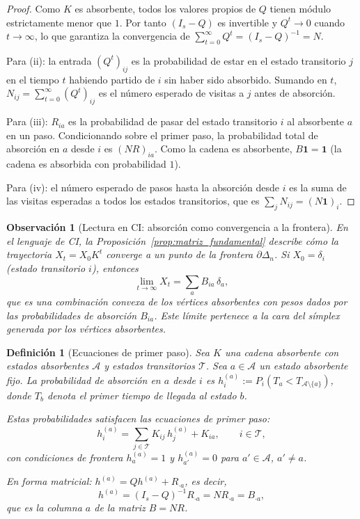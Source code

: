﻿\documentclass[12pt]{article}
\newtheorem{definicion}{Definición}[section]
\newtheorem{observacion}{Observación}[section]
\begin{document}
\begin{proof}
Como $K$ es absorbente, todos los valores propios de $Q$ tienen módulo estrictamente menor que $1$. Por tanto $(I_s-Q)$ es invertible y $Q^t\to 0$ cuando $t\to\infty$, lo que garantiza la convergencia de $\sum_{t=0}^\infty Q^t = (I_s-Q)^{-1} = N$.

Para (ii): la entrada $(Q^t)_{ij}$ es la probabilidad de estar en el estado transitorio $j$ en el tiempo $t$ habiendo partido de $i$ sin haber sido absorbido. Sumando en $t$, $N_{ij} = \sum_{t=0}^\infty (Q^t)_{ij}$ es el número esperado de visitas a $j$ antes de absorción.

Para (iii): $R_{ia}$ es la probabilidad de pasar del estado transitorio $i$ al absorbente $a$ en un paso. Condicionando sobre el primer paso, la probabilidad total de absorción en $a$ desde $i$ es $(NR)_{ia}$. Como la cadena es absorbente, $B\mathbf{1} = \mathbf{1}$ (la cadena es absorbida con probabilidad $1$).

Para (iv): el número esperado de pasos hasta la absorción desde $i$ es la suma de las visitas esperadas a todos los estados transitorios, que es $\sum_j N_{ij} = (N\mathbf{1})_i$.
\end{proof}

\begin{observacion}[Lectura en CI: absorción como convergencia a la frontera]\label{obs:absorcion_CI}
En el lenguaje de CI, la Proposición~\ref{prop:matriz_fundamental} describe cómo la trayectoria $X_t = X_0 K^t$ converge a un punto de la frontera $\partial\Delta_n$. Si $X_0 = \delta_i$ (estado transitorio $i$), entonces
\[
\lim_{t\to\infty} X_t = \sum_{a} B_{ia}\,\delta_a,
\]
que es una combinación convexa de los vértices absorbentes con pesos dados por las probabilidades de absorción $B_{ia}$. Este límite pertenece a la cara del símplex generada por los vértices absorbentes.
\end{observacion}

\begin{definicion}[Ecuaciones de primer paso]\label{def:primer_paso}
Sea $K$ una cadena absorbente con estados absorbentes $\mathcal{A}$ y estados transitorios $\mathcal{T}$. Sea $a\in\mathcal{A}$ un estado absorbente fijo. La \emph{probabilidad de absorción en $a$ desde $i$} es $h_i^{(a)} := P_i(T_a < T_{\mathcal{A}\setminus\{a\}})$, donde $T_b$ denota el primer tiempo de llegada al estado $b$.

Estas probabilidades satisfacen las \emph{ecuaciones de primer paso}:
\[
h_i^{(a)} = \sum_{j\in\mathcal{T}} K_{ij}\,h_j^{(a)} + K_{ia}, \qquad i\in\mathcal{T},
\]
con condiciones de frontera $h_a^{(a)} = 1$ y $h_{a'}^{(a)} = 0$ para $a'\in\mathcal{A}$, $a'\neq a$.

En forma matricial: $h^{(a)} = Qh^{(a)} + R_{\cdot a}$, es decir,
\[
h^{(a)} = (I_s-Q)^{-1}R_{\cdot a} = NR_{\cdot a} = B_{\cdot a},
\]
que es la columna $a$ de la matriz $B = NR$.
\end{definicion}
\end{document}
